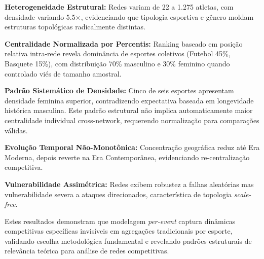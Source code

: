 \textbf{Heterogeneidade Estrutural:} Redes variam de 22 a 1.275 atletas, com densidade variando 5.5×, evidenciando que tipologia esportiva e gênero moldam estruturas topológicas radicalmente distintas.

\textbf{Centralidade Normalizada por Percentis:} Ranking baseado em posição relativa intra-rede revela dominância de esportes coletivos (Futebol 45\%, Basquete 15\%), com distribuição 70\% masculino e 30\% feminino quando controlado viés de tamanho amostral.

\textbf{Padrão Sistemático de Densidade:} Cinco de seis esportes apresentam densidade feminina superior, contradizendo expectativa baseada em longevidade histórica masculina. Este padrão estrutural não implica automaticamente maior centralidade individual cross-network, requerendo normalização para comparações válidas.

\textbf{Evolução Temporal Não-Monotônica:} Concentração geográfica reduz até Era Moderna, depois reverte na Era Contemporânea, evidenciando re-centralização competitiva.

\textbf{Vulnerabilidade Assimétrica:} Redes exibem robustez a falhas aleatórias mas vulnerabilidade severa a ataques direcionados, característica de topologia \textit{scale-free}.

Estes resultados demonstram que modelagem \textit{per-event} captura dinâmicas competitivas específicas invisíveis em agregações tradicionais por esporte, validando escolha metodológica fundamental e revelando padrões estruturais de relevância teórica para análise de redes competitivas.
